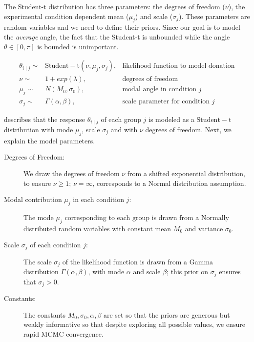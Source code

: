  The Student-t distribution has three parameters: the degrees of freedom ($\nu$), the experimental condition dependent mean ($\mu_j$) and scale ($\sigma_j$).  These parameters are random variables and we need to define their priors. Since our goal is to model the \textit{average} angle, the fact that the Student-t is unbounded while the angle $\theta \in [0, \pi]$ is bounded is unimportant.

\begin{align}
  \theta_{i \mid j} \sim & \mathrm{Student-t}(\nu, \mu_j, \sigma_j),   & \text{likelihood function to model donation} \label{eq:bayesian formulation} \\
  \nu \sim & 1 + exp(\lambda), & \text{degrees of freedom} \\
  \mu_j \sim & N(M_0, \sigma_0), & \text{modal angle in condition } j \\
  \sigma_j \sim & \Gamma(\alpha, \beta), & \text{scale parameter for condition } j
\end{align}
 
 describes that the response $\theta_{i \mid j}$ of each group $j$ is modeled as a $\mathrm{Student-t}$ distribution with mode $\mu_j$,  scale $\sigma_j$ and with $\nu$ degrees of freedom. Next, we explain the model parameters.


\begin{description}
    \item[Degrees of Freedom:] We draw the degrees of freedom $\nu$ from a shifted exponential distribution, to ensure $\nu \geq 1$; $\nu=\infty$, corresponds to a Normal distribution assumption.
    \item[Modal contribution $\mu_j$ in each condition $j$:] The mode $\mu_j$ corresponding to each group is drawn from a Normally distributed random variables with constant mean $M_0$ and variance $\sigma_0$. 
    \item[Scale $\sigma_j$ of each condition $j$:]  The scale $\sigma_j$ of the likelihood function is drawn from a Gamma distribution $\Gamma(\alpha, \beta)$, with mode $\alpha$ and scale $\beta$; this prior on $\sigma_j$ ensures that $\sigma_j > 0$. 
    \item[Constants:] The constants $M_0, \sigma_0, \alpha, \beta$ are set so that the priors are generous but weakly informative so that despite exploring all possible values, we ensure rapid MCMC convergence.
\end{description}

